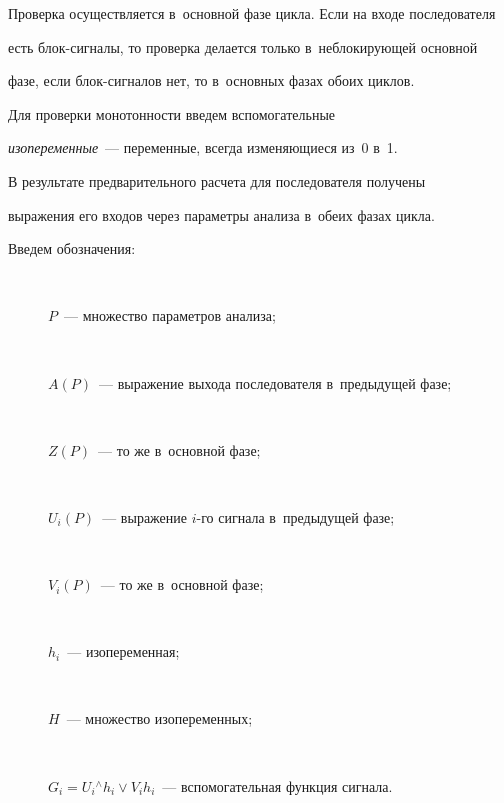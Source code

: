 Проверка осуществляется в~основной фазе цикла. Если на входе последователя 


есть блок-сиг\-на\-лы, то проверка делается только в~неблокирующей основной 


фазе, если блок-сигналов нет, то в~основных фазах обоих циклов.


   


   Для проверки монотонности введем вспомогательные 


\textit{изопеременные}~--- переменные, всегда изменяющиеся из~0 в~1.


   


   В результате предварительного расчета для последователя получены 


выражения его входов через параметры анализа в~обеих фазах цикла.


   


   Введем обозначения:


   \begin{description}


\item[\,]    $P$~--- множество параметров анализа;


   


\item[\,]    $A (P)$~--- выражение выхода последователя в~предыдущей фазе;


   


\item[\,] $Z (P)$~--- то же в~основной фазе;


   


\item[\,] $U_i (P)$~--- выражение $i$-го сигнала в~предыдущей фазе;


   


\item[\,] $V_i (P)$~--- то же в~основной фазе;


   


\item[\,] $h_i$~--- изопеременная;


   


\item[\,] $H$~--- множество изопеременных;


   


\item[\,] $G_i = U_i {}^{\wedge}h_i \vee V_i h_i$~--- вспомогательная функция сигнала.


\end{description}


